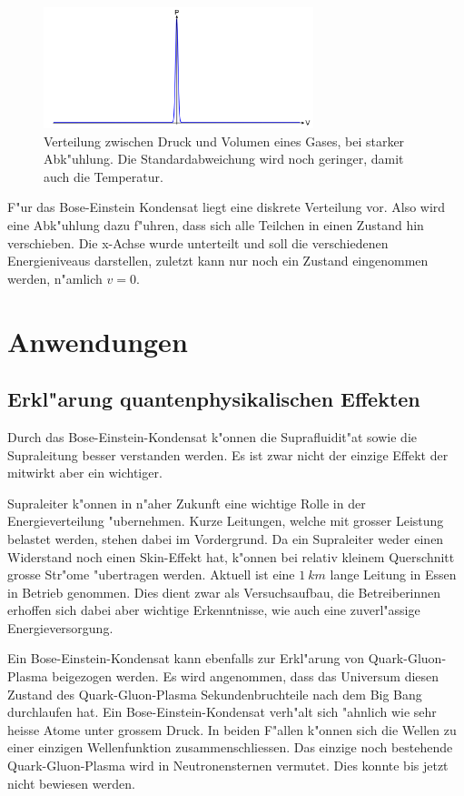\begin{refsection}
\begin{figure}
    \centering
    \includegraphics[width = 0.7\textwidth]{./bose/gauss3.png}
    \caption[Verteilung bei starker Abk"uhlung]{Verteilung zwischen Druck und Volumen eines Gases, bei starker Abk"uhlung. Die Standardabweichung wird noch geringer, damit auch die Temperatur.}
	\label{fig:Gauss3}
\end{figure}
F"ur das Bose-Einstein Kondensat liegt eine diskrete Verteilung vor.
Also wird eine Abk"uhlung dazu f"uhren, dass sich alle Teilchen in einen Zustand hin verschieben. Die x-Achse wurde unterteilt und soll die verschiedenen Energieniveaus darstellen, zuletzt kann nur noch ein Zustand eingenommen werden, n"amlich $v = 0$. 

\section{Anwendungen}
\subsection{Erkl"arung quantenphysikalischen Effekten}
Durch das Bose-Einstein-Kondensat k"onnen die Suprafluidit"at sowie die Supraleitung besser verstanden werden. Es ist zwar nicht der einzige Effekt der mitwirkt aber ein wichtiger. 

Supraleiter k"onnen in n"aher Zukunft eine wichtige Rolle in der Energieverteilung "ubernehmen. Kurze Leitungen, welche mit grosser Leistung belastet werden, stehen dabei im Vordergrund. Da ein Supraleiter weder einen Widerstand noch einen Skin-Effekt hat, k"onnen bei relativ kleinem Querschnitt grosse Str"ome "ubertragen werden. 
Aktuell ist eine $1~km$ lange Leitung in Essen in Betrieb genommen. Dies dient zwar als Versuchsaufbau, die Betreiberinnen erhoffen sich dabei aber wichtige Erkenntnisse, wie auch eine zuverl"assige Energieversorgung. \cite{bose:SupraVerteilnetze}

Ein Bose-Einstein-Kondensat kann ebenfalls zur Erkl"arung von Quark-Gluon-Plasma beigezogen werden. Es wird angenommen, dass das Universum diesen Zustand des Quark-Gluon-Plasma Sekundenbruchteile nach dem Big Bang durchlaufen hat. Ein Bose-Einstein-Kondensat verh"alt sich "ahnlich wie sehr heisse Atome unter grossem Druck. In beiden F"allen k"onnen sich die Wellen zu einer einzigen Wellenfunktion zusammenschliessen. Das einzige noch bestehende Quark-Gluon-Plasma wird in Neutronensternen vermutet. Dies konnte bis jetzt nicht bewiesen werden. \cite{bose:MITvideo}


\end{refsection}
